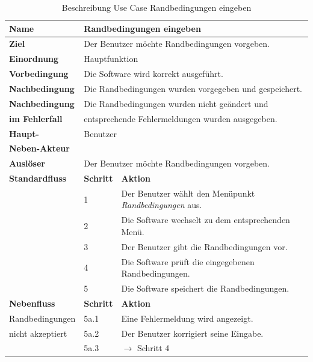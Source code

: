 \begin{table} [H]
	\centering
	\begin{tabular}{|l|l|l|}
		\hline
		\textbf{Name} 			& \multicolumn{2}{|l|}{Randbedingungen eingeben}  \\
		\hline
		\textbf{Ziel} 			& \multicolumn{2}{|l|}{Der Benutzer möchte Randbedingungen vorgeben. }\\ 
		\hline
		\textbf{Einordnung}		& \multicolumn{2}{|l|}{Hauptfunktion}\\
		\hline
		\textbf{Vorbedingung}	& \multicolumn{2}{|l|}{Die Software wird korrekt ausgeführt.} \\
		\hline
		\textbf{Nachbedingung}	& \multicolumn{2}{|l|}{Die Randbedingungen wurden vorgegeben und gespeichert.}\\
		\hline
		\textbf{Nachbedingung} 	& \multicolumn{2}{|l|}{Die Randbedingungen wurden nicht geändert und}\\
		\textbf{im Fehlerfall}	& \multicolumn{2}{|l|}{entsprechende Fehlermeldungen wurden ausgegeben.}\\
		\hline
		\textbf{Haupt-} 			& \multicolumn{2}{|l|}{Benutzer}\\
		\textbf{Neben-Akteur}	& \multicolumn{2}{|l|}{	}			\\
		\hline
		\textbf{Auslöser} 		& \multicolumn{2}{|l|}{Der Benutzer möchte Randbedingungen vorgeben.} \\
		\hline 
		\textbf{Standardfluss} & \textbf{Schritt} & \textbf{Aktion} \\
		\hline
		&	1	& Der Benutzer wählt den Menüpunkt \emph{Randbedingungen} aus. \\
		\cline{2-3}
		&	2	& Die Software wechselt zu dem entsprechenden Menü.\\
		\cline{2-3}
		&	3	& Der Benutzer gibt die Randbedingungen vor.\\
		\cline{2-3}
		&	4	& Die Software prüft die eingegebenen Randbedingungen.\\
		\cline{2-3}
		&	5	& Die Software speichert die Randbedingungen.\\
		\hline
		\textbf{Nebenfluss} & \textbf{Schritt} & \textbf{Aktion}\\
		\hline
		Randbedingungen  & 5a.1 & Eine Fehlermeldung wird angezeigt.\\
		\cline{2-3}
		nicht akzeptiert 	& 5a.2	& Der Benutzer korrigiert seine Eingabe.\\
		\cline{2-3}
					& 5a.3 	& $\rightarrow$ Schritt 4\\
		\hline
	\end{tabular}
	\caption{Beschreibung Use Case Randbedingungen eingeben}
	\label{Beschreibung Use Case Randbedingungen eingeben}
\end{table}

